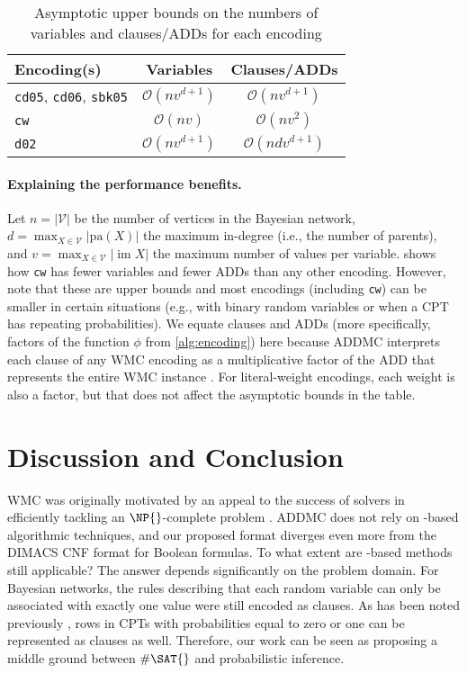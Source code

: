 \documentclass{article}
\DeclareMathOperator{\im}{im}
\begin{document}
\begin{table}
  \centering
  \begin{tabular}{lcc}
    \toprule
    Encoding(s) & Variables & Clauses/ADDs \\
    \midrule
    \texttt{cd05}, \texttt{cd06}, \texttt{sbk05} & $\mathcal{O}(nv^{d+1})$ & $\mathcal{O}(nv^{d+1})$ \\
    \texttt{cw} & $\mathcal{O}(nv)$ & $\mathcal{O}(nv^2)$ \\
    \texttt{d02} & $\mathcal{O}(nv^{d+1})$ & $\mathcal{O}(ndv^{d+1})$ \\
    \bottomrule
  \end{tabular}
  \caption{Asymptotic upper bounds on the numbers of variables and clauses/ADDs
    for each encoding}
  \label{tbl:asymptotes}
\end{table}

\paragraph{Explaining the performance benefits.} Let $n = |\mathcal{V}|$ be the
number of vertices in the Bayesian network, $d = \max_{X \in \mathcal{V}}
|\mathrm{pa}(X)|$ the maximum in-degree (i.e., the number of parents), and $v =
\max_{X \in \mathcal{V}} |\im X|$ the maximum number of values per variable.
 shows how \texttt{cw} has fewer variables and fewer
ADDs than any other encoding. However, note that these are upper bounds and most
encodings (including \texttt{cw}) can be smaller in certain situations (e.g.,
with binary random variables or when a CPT has repeating probabilities). We
equate clauses and ADDs (more specifically, factors of the function $\phi$ from
\cref{alg:encoding}) here because ADDMC interprets each clause of any WMC
encoding as a multiplicative factor of the ADD that represents the entire WMC
instance \cite{DBLP:conf/aaai/DudekPV20}. For literal-weight encodings, each
weight is also a factor, but that does not affect the asymptotic bounds in the
table.


\section{Discussion and Conclusion}

WMC was originally motivated by an appeal to the success of \SAT{} solvers in
efficiently tackling an $\NP{}$-complete problem \cite{DBLP:conf/aaai/SangBK05}.
ADDMC does not rely on \SAT{}-based algorithmic techniques, and our proposed
format diverges even more from the DIMACS CNF format for Boolean formulas. To
what extent are \SAT{}-based methods still applicable? The answer depends
significantly on the problem domain. For Bayesian networks, the rules describing
that each random variable can only be associated with exactly one value were
still encoded as clauses. As has been noted previously
\cite{DBLP:conf/sat/ChaviraD06}, rows in CPTs with probabilities equal to zero
or one can be represented as clauses as well. Therefore, our work can be seen as
proposing a middle ground between $\#\SAT{}$ and probabilistic inference.
\end{document}

